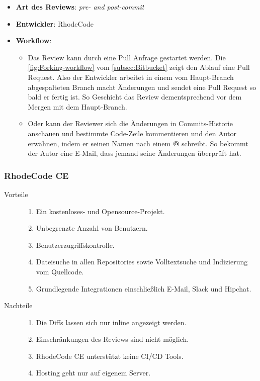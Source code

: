 \begin{itemize}
	\item \textbf{Art des Reviews}: \textit{pre- and post-commit}
	\item \textbf{Entwickler}: RhodeCode
	\item \textbf{Workflow}:
	\begin{itemize}
		\item Das Review kann durch eine Pull Anfrage gestartet werden. Die \cref{fig:Forking-workflow} vom \cref{subsec:Bitbucket} zeigt den Ablauf
			eine Pull Request. Also der Entwickler arbeitet in einem vom Haupt-Branch abgespalteten Branch macht Änderungen und sendet eine Pull Request so bald er fertig ist. 
			So Geschieht das Review dementsprechend vor dem Mergen mit dem Haupt-Branch.
		\item Oder kann der Reviewer sich die Änderungen in Commits-Historie anschauen und bestimmte Code-Zeile kommentieren und den Autor erwähnen, indem er seinen Namen nach einem 
			\textbf{@} schreibt. So bekommt der Autor eine E-Mail, dass jemand seine Änderungen überprüft hat.
	\end{itemize}
\end{itemize}

\subsubsection{RhodeCode CE}
\label{subsubsec:RhodeCode CE}

\begin{description}
	\item [Vorteile] \hfill
		\begin{enumerate}
			\item Ein kostenloses- und Opensource-Projekt.
			\item Unbegrenzte Anzahl von Benutzern.
			\item Benutzerzugriffskontrolle.
			\item Dateisuche in allen Repositories sowie Volltextsuche und Indizierung vom Quellcode.
			\item Grundlegende Integrationen einschließlich E-Mail, Slack und Hipchat.
		\end{enumerate}
	\item [Nachteile] \hfill
		\begin{enumerate}
			\item Die Diffs lassen sich nur inline angezeigt werden.
			\item Einschränkungen des Reviews sind nicht möglich.
			\item RhodeCode CE unterstützt keine \ac{CI}/\ac{CD} Tools.
			\item Hosting geht nur auf eigenem Server.
		\end{enumerate}
\end{description}


